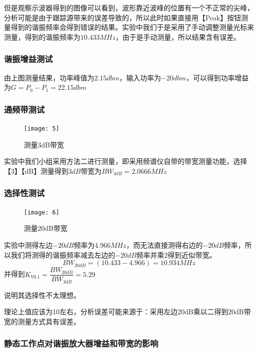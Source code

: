 \documentclass{../source/Experiment}
\begin{document}
            但是观察示波器得到的图像可以看到，波形靠近波峰的位置有一个不正常的尖峰，分析可能是由于跟踪源带来的误差导致的，所以此时如果直接用【Peak】按钮测量得到的谐振频率会得到错误的结果。实验中我们于是采用了手动调整测量光标来测量，得到的谐振频率为$10.433MHz$，由于是手动测量，所以结果含有误差。
            
            \subsubsection{谐振增益测试}

            由上图测量结果，功率峰值为$2.15dbm$，输入功率为$-20dbm$，可以得到功率增益为$G = P_0 - P_1 = 22.15dbm$
            
            \subsubsection{通频带测试}

            \begin{figure}[H]
                \centering
                \texttt{[image: 5]}
                \caption{测量3dB带宽}
            \end{figure}

            实验中我们小组采用方法二进行测量，即采用频谱仪自带的带宽测量功能，选择【3】【dB】测量得到$3dB$带宽为$BW_{3dB} = 2.0666MHz$
            
            \subsubsection{选择性测试}

            \begin{figure}[H]
                \centering
                \texttt{[image: 6]}
                \caption{测量20dB带宽}
            \end{figure}

            实验中测得左边$-20dB$频率为$4.966MHz$，而无法直接测得右边的$-20dB$频率，所以我们将测得的谐振频率减去左边的$-20dB$频率并乘2得到近似带宽。
            $$BW_{20dB} = (10.433 - 4.966) = 10.934MHz$$
            并得到$K_{V0.1} = \dfrac{BW_{20dB}}{BW_{3dB}} = 5.29$

            说明其选择性不太理想。

            理论上值应该为10左右，分析误差可能来源于：采用左边20dB乘以二得到20dB带宽的测量方式具有误差。
            
            \subsubsection{静态工作点对谐振放大器增益和带宽的影响}
\end{document}
